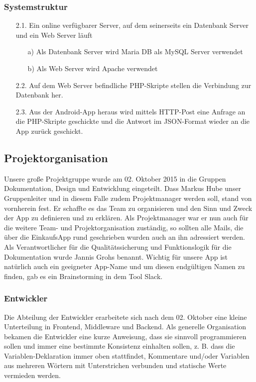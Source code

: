 \documentclass[12pt,a4paper]{article}
\begin{document}
\subsubsection{Systemstruktur}
\begin{itemize}
 \item[2.1.] Ein online verfügbarer Server, auf dem seinerseits ein Datenbank Server und ein Web Server läuft
 \begin{itemize}
\item[a)]Als Datenbank Server wird Maria DB als MySQL Server verwendet
\item[b)]Als Web Server wird Apache verwendet
\end{itemize}
\item[2.2.] Auf dem Web Server befindliche PHP-Skripte stellen die Verbindung zur Datenbank her.
\item[2.3.] Aus der Android-App heraus wird mittels HTTP-Post eine Anfrage an die PHP-Skripte geschickte und die Antwort im JSON-Format wieder an die App zurück geschickt.
\end{itemize}

\newpage

\subsection{Projektorganisation}
Unsere große Projektgruppe wurde am 02. Oktober 2015 in die Gruppen Dokumentation, Design und Entwicklung eingeteilt.
Dass Markus Hube unser Gruppenleiter und in diesem Falle zudem Projektmanager werden soll, stand von vornherein fest.
Er schaffte es das Team zu organisieren und den Sinn und Zweck der App zu definieren und zu erklären. Als Projektmanager war er nun auch für die weitere Team- und Projektorganisation zuständig, so sollten alle Mails, die über die EinkaufsApp rund geschrieben wurden auch an ihn adressiert werden.
Als Verantwortlicher für die Qualitätssicherung und Funktionslogik für die Dokumentation wurde Jannis Grohs benannt.
Wichtig für unsere App ist natürlich auch ein geeigneter App-Name und um diesen endgültigen Namen zu finden, gab es ein Brainstorming in dem Tool Slack.

\subsubsection{Entwickler}
Die Abteilung der Entwickler erarbeitete sich nach dem 02. Oktober eine kleine Unterteilung in Frontend, Middleware und Backend.
Als generelle Organisation bekamen die Entwickler eine kurze Anweisung, dass sie sinnvoll programmieren sollen und immer eine bestimmte Konsistenz einhalten sollen, z. B. dass die Variablen-Deklaration immer oben stattfindet, Kommentare und/oder Variablen aus mehreren Wörtern mit Unterstrichen verbunden und statische Werte vermieden werden.
\end{document}
